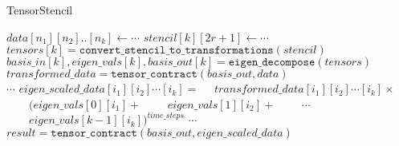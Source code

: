 \documentclass{article}
\begin{document}
\begin{algorithm}[H]
\caption{TensorStencil}\label{euclid}
\begin{algorithmic}[1]
\State $\textit{data}[n_1][n_2]..[n_k] \gets \cdots$ 
\State $\textit{stencil}[k][2r+1] \gets \cdots$ \\
\State $\textit{tensors}[k] = \texttt{convert\_stencil\_to\_transformations}(\textit{stencil})$
\State $\textit{basis\_in}[k],\textit{eigen\_vals}[k], \textit{basis\_out}[k] = \texttt{eigen\_decompose}(\textit{tensors})$ \\
\State $\textit{transformed\_data} = \texttt{tensor\_contract}(\textit{basis\_out},\textit{data})$ \\
\State $\cdots$
\State $\textit{eigen\_scaled\_data}[i_1][i_2]\cdots[i_k] = $
\State $\quad \textit{transformed\_data}[i_1][i_2]\cdots[i_k] \times $
\State $\quad \quad (\textit{eigen\_vals}[0][i_1] + $
\State $\quad \quad \textit{eigen\_vals}[1][i_2] + $
\State $\quad \quad \cdots$
\State $\quad \quad \textit{eigen\_vals}[k-1][i_k])^{\textit{time\_steps}}$
\EndFor 
\State $\cdots$
\EndFor 
\EndFor \\
\State $\textit{result} = \texttt{tensor\_contract}(\textit{basis\_out},\textit{eigen\_scaled\_data})$
\end{algorithmic}
\end{algorithm}
\end{document}
